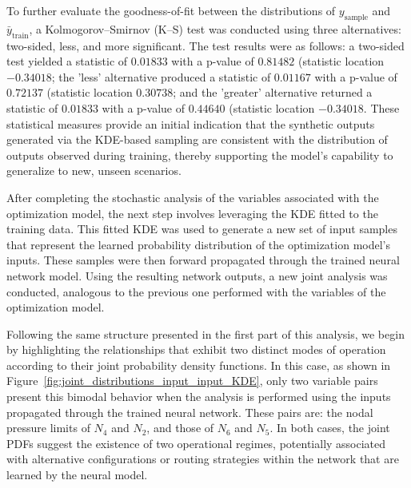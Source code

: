 To further evaluate the goodness-of-fit between the distributions of \( y_{\text{sample}} \) and \( \bar{y}_{\text{train}} \), a Kolmogorov–Smirnov (K–S) test was conducted using three alternatives: two-sided, less, and more significant. The test results were as follows: a two-sided test yielded a statistic of \( 0.01833 \) with a p-value of \( 0.81482 \) (statistic location \(-0.34018\); the 'less' alternative produced a statistic of \( 0.01167 \) with a p-value of \( 0.72137 \) (statistic location \(0.30738\); and the 'greater' alternative returned a statistic of \( 0.01833 \) with a p-value of \( 0.44640 \) (statistic location \(-0.34018\). These statistical measures provide an initial indication that the synthetic outputs generated via the KDE-based sampling are consistent with the distribution of outputs observed during training, thereby supporting the model's capability to generalize to new, unseen scenarios.




After completing the stochastic analysis of the variables associated with the optimization model, the next step involves leveraging the KDE fitted to the training data. This fitted KDE was used to generate a new set of input samples that represent the learned probability distribution of the optimization model's inputs. These samples were then forward propagated through the trained neural network model. Using the resulting network outputs, a new joint analysis was conducted, analogous to the previous one performed with the variables of the optimization model. 

Following the same structure presented in the first part of this analysis, we begin by highlighting the relationships that exhibit two distinct modes of operation according to their joint probability density functions. In this case, as shown in Figure~\cref{fig:joint_distributions_input_input_KDE}, only two variable pairs present this bimodal behavior when the analysis is performed using the inputs propagated through the trained neural network. These pairs are: the nodal pressure limits of $N_4$ and $N_2$, and those of $N_6$ and $N_5$. In both cases, the joint PDFs suggest the existence of two operational regimes, potentially associated with alternative configurations or routing strategies within the network that are learned by the neural model. 


